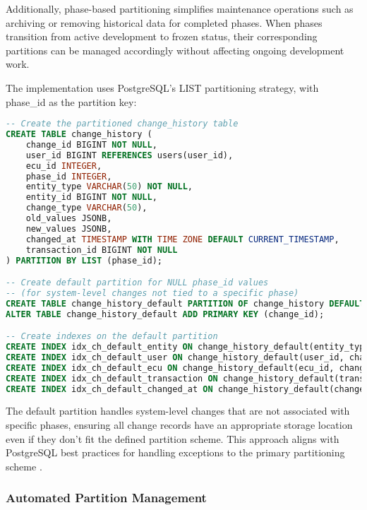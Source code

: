 Additionally, phase-based partitioning simplifies maintenance operations such as archiving or removing historical data for completed phases. When phases transition from active development to frozen status, their corresponding partitions can be managed accordingly without affecting ongoing development work.

The implementation uses PostgreSQL's LIST partitioning strategy, with phase\_id as the partition key:

\begin{lstlisting}[language=SQL, caption={Change History Table Partitioning Definition}, label={lst:change-history-partitioning}]
-- Create the partitioned change_history table
CREATE TABLE change_history (
    change_id BIGINT NOT NULL,
    user_id BIGINT REFERENCES users(user_id),
    ecu_id INTEGER,
    phase_id INTEGER, 
    entity_type VARCHAR(50) NOT NULL,
    entity_id BIGINT NOT NULL,
    change_type VARCHAR(50),
    old_values JSONB,
    new_values JSONB,
    changed_at TIMESTAMP WITH TIME ZONE DEFAULT CURRENT_TIMESTAMP,
    transaction_id BIGINT NOT NULL
) PARTITION BY LIST (phase_id);

-- Create default partition for NULL phase_id values 
-- (for system-level changes not tied to a specific phase)
CREATE TABLE change_history_default PARTITION OF change_history DEFAULT;
ALTER TABLE change_history_default ADD PRIMARY KEY (change_id);

-- Create indexes on the default partition
CREATE INDEX idx_ch_default_entity ON change_history_default(entity_type, entity_id, changed_at);
CREATE INDEX idx_ch_default_user ON change_history_default(user_id, changed_at);
CREATE INDEX idx_ch_default_ecu ON change_history_default(ecu_id, changed_at);
CREATE INDEX idx_ch_default_transaction ON change_history_default(transaction_id, changed_at);
CREATE INDEX idx_ch_default_changed_at ON change_history_default(changed_at);
\end{lstlisting}

The default partition handles system-level changes that are not associated with specific phases, ensuring all change records have an appropriate storage location even if they don't fit the defined partition scheme. This approach aligns with PostgreSQL best practices for handling exceptions to the primary partitioning scheme \cite{obe2017postgresql}.

\subsubsection{Automated Partition Management}
\label{subsubsec:automated-partition-management}

